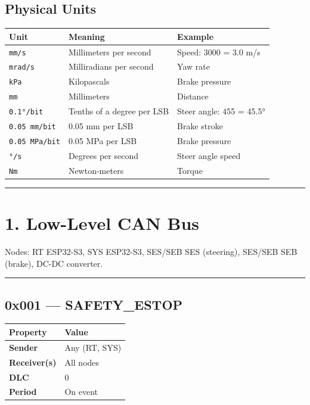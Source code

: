 \documentclass[12pt,a4paper,oneside]{report}
\begin{document}
\subsection{Physical Units}\label{physical-units}

\begin{longtable}[]{@{}lll@{}}
\toprule\noalign{}
Unit & Meaning & Example \\
\midrule\noalign{}
\endhead
\bottomrule\noalign{}
\endlastfoot
\texttt{mm/s} & Millimeters per second & Speed: 3000 = 3.0 m/s \\
\texttt{mrad/s} & Milliradians per second & Yaw rate \\
\texttt{kPa} & Kilopascals & Brake pressure \\
\texttt{mm} & Millimeters & Distance \\
\texttt{0.1°/bit} & Tenths of a degree per LSB & Steer angle: 455 = 45.5° \\
\texttt{0.05\ mm/bit} & 0.05 mm per LSB & Brake stroke \\
\texttt{0.05\ MPa/bit} & 0.05 MPa per LSB & Brake pressure \\
\texttt{°/s} & Degrees per second & Steer angle speed \\
\texttt{Nm} & Newton-meters & Torque \\
\end{longtable}

\begin{center}\rule{0.5\linewidth}{0.5pt}\end{center}

\section{1. Low-Level CAN Bus}\label{low-level-can-bus}

Nodes: RT ESP32-S3, SYS ESP32-S3, SES/SEB SES (steering), SES/SEB SEB (brake),
DC-DC converter.

\begin{center}\rule{0.5\linewidth}{0.5pt}\end{center}

\subsection{0x001 --- SAFETY\_ESTOP}\label{x001-safety_estop}

\begin{longtable}[]{@{}ll@{}}
\toprule\noalign{}
Property & Value \\
\midrule\noalign{}
\endhead
\bottomrule\noalign{}
\endlastfoot
\textbf{Sender} & Any (RT, SYS) \\
\textbf{Receiver(s)} & All nodes \\
\textbf{DLC} & 0 \\
\textbf{Period} & On event \\
\end{longtable}
\end{document}
